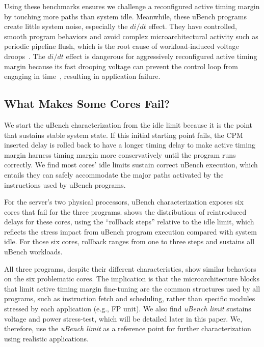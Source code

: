 Using these benchmarks ensures we challenge a reconfigured active timing margin by touching more paths than system idle. Meanwhile, these uBench programs create little system noise, especially the $di/dt$ effect. They have controlled, smooth program behaviors and avoid complex microarchitectural activity such as periodic pipeline flush, which is the root cause of workload-induced voltage droops~\cite{grochowski2002microarchitectural,powell2003pipeline,reddi2009voltage,reddi2010voltage,miller2012vrsync}. The $di/dt$ effect is dangerous for aggressively reconfigured active timing margin because its fast drooping voltage can prevent the control loop from engaging in time~\cite{vezyrtzis2018droop}, resulting in application failure. 

\subsection{What Makes Some Cores Fail?}
\label{sec:process:ubench_profiling}

We start the uBench characterization from the idle limit because it is the point that sustains stable system state. If this initial starting point fails, the CPM inserted delay is rolled back to have a longer timing delay to make active timing margin harness timing margin more conservatively until the program runs correctly. We find most cores' idle limits sustain correct uBench execution, which entails they can safely accommodate the major paths activated by the instructions used by uBench programs. 

For the server's two physical processors, uBench characterization exposes six cores that fail for the three programs.  shows the distributions of reintroduced delays for these cores, using the ``rollback steps'' relative to the idle limit, which reflects the stress impact from uBench program execution compared with system idle. For those six cores, rollback ranges from one to three steps and sustains all uBench workloads.

All three programs, despite their different characteristics, show similar behaviors on the six problematic cores. The implication is that the microarchitecture blocks that limit active timing margin fine-tuning are the common structures used by all programs, such as instruction fetch and scheduling, rather than specific modules stressed by each application (e.g., FP unit). We also find \textit{uBench limit} sustains voltage and power stress-test, which will be detailed later in this paper. We, therefore, use the \textit{uBench limit} as a reference point for further characterization using realistic applications.

